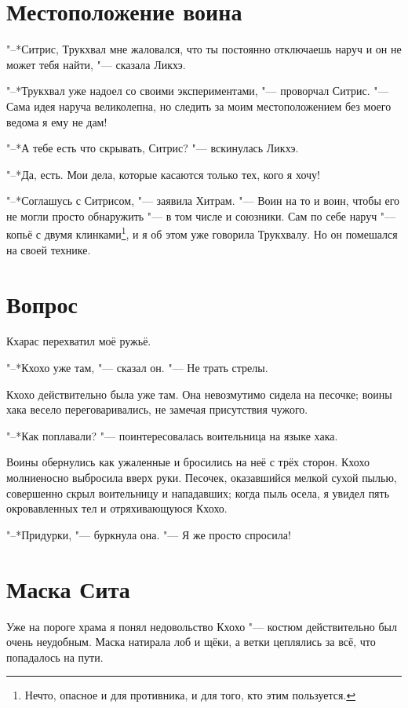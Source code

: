 \documentclass[a4paper,10pt]{book}
\begin{document}
 \section{Местоположение воина}

 "--*Ситрис, Трукхвал мне жаловался, что ты постоянно отключаешь наруч и он не 
может тебя найти, "--- сказала Ликхэ.

"--*Трукхвал уже надоел со своими экспериментами, "--- проворчал Ситрис. "--- 
Сама идея наруча великолепна, но следить за моим местоположением без моего 
ведома я ему не дам!

"--*А тебе есть что скрывать, Ситрис? "--- вскинулась Ликхэ.

"--*Да, есть. Мои дела, которые касаются только тех, кого я хочу!

"--*Соглашусь с Ситрисом, "--- заявила Хитрам. "--- Воин на то и воин, чтобы 
его не могли просто обнаружить "--- в том числе и союзники. Сам по себе наруч 
"--- копьё с двумя клинками\footnote{Нечто, опасное и для противника, и для 
того, кто этим пользуется.}, и я об этом уже говорила Трукхвалу. Но он 
помешался 
на своей технике.
  
 \section{Вопрос}
 
 Кхарас перехватил моё ружьё.

"--*Кхохо уже там, "--- сказал он. "--- Не трать стрелы.

Кхохо действительно была уже там. Она невозмутимо сидела на песочке; воины хака 
весело переговаривались, не замечая присутствия чужого.

"--*Как поплавали? "--- поинтересовалась воительница на языке хака.

Воины обернулись как ужаленные и бросились на неё с трёх сторон. Кхохо 
молниеносно выбросила вверх руки. Песочек, оказавшийся мелкой сухой пылью, 
совершенно скрыл воительницу и нападавших; когда пыль осела, я увидел пять 
окровавленных тел и отряхивающуюся Кхохо.

"--*Придурки, "--- буркнула она. "--- Я же просто спросила!
 
\section{Маска Сита}

Уже на пороге храма я понял недовольство Кхохо "--- костюм действительно был 
очень неудобным. Маска натирала лоб и щёки, а ветки цеплялись за всё, что 
попадалось на пути.
\end{document}
